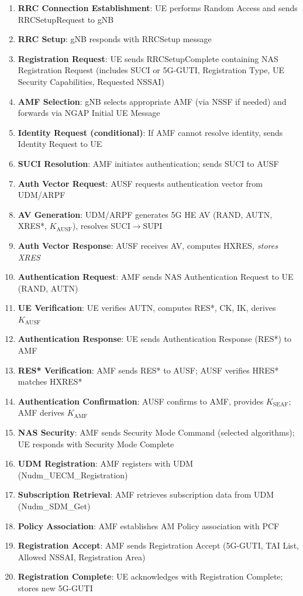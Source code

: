 \begin{enumerate}
\def\labelenumi{\arabic{enumi}.}
\tightlist
\item
  \textbf{RRC Connection Establishment}: UE performs Random Access and sends RRCSetupRequest to gNB
\item
  \textbf{RRC Setup}: gNB responds with RRCSetup message
\item
  \textbf{Registration Request}: UE sends RRCSetupComplete containing NAS Registration Request (includes SUCI or 5G-GUTI, Registration Type, UE Security Capabilities, Requested NSSAI)
\item
  \textbf{AMF Selection}: gNB selects appropriate AMF (via NSSF if needed) and forwards via NGAP Initial UE Message
\item
  \textbf{Identity Request (conditional)}: If AMF cannot resolve identity, sends Identity Request to UE
\item
  \textbf{SUCI Resolution}: AMF initiates authentication; sends SUCI to AUSF
\item
  \textbf{Auth Vector Request}: AUSF requests authentication vector from UDM/\allowbreak{}ARPF
\item
  \textbf{AV Generation}: UDM/\allowbreak{}ARPF generates 5G HE AV (RAND, AUTN, XRES*, \ensuremath{K_{\mathrm{AUSF}}}), resolves SUCI\ensuremath{\to}SUPI
\item
  \textbf{Auth Vector Response}: AUSF receives AV, computes HXRES\emph{, stores XRES}
\item
  \textbf{Authentication Request}: AMF sends NAS Authentication Request to UE (RAND, AUTN)
\item
  \textbf{UE Verification}: UE verifies AUTN, computes RES*, CK, IK, derives \ensuremath{K_{\mathrm{AUSF}}}
\item
  \textbf{Authentication Response}: UE sends Authentication Response (RES*) to AMF
\item
  \textbf{RES* Verification}: AMF sends RES* to AUSF; AUSF verifies HRES* matches HXRES*
\item
  \textbf{Authentication Confirmation}: AUSF confirms to AMF, provides \ensuremath{K_{\mathrm{SEAF}}}; AMF derives \ensuremath{K_{\mathrm{AMF}}}
\item
  \textbf{NAS Security}: AMF sends Security Mode Command (selected algorithms); UE responds with Security Mode Complete
\item
  \textbf{UDM Registration}: AMF registers with UDM (Nudm\_\allowbreak{}UECM\_\allowbreak{}Registration)
\item
  \textbf{Subscription Retrieval}: AMF retrieves subscription data from UDM (Nudm\_\allowbreak{}SDM\_\allowbreak{}Get)
\item
  \textbf{Policy Association}: AMF establishes AM Policy association with PCF
\item
  \textbf{Registration Accept}: AMF sends Registration Accept (5G-GUTI, TAI List, Allowed NSSAI, Registration Area)
\item
  \textbf{Registration Complete}: UE acknowledges with Registration Complete; stores new 5G-GUTI
\end{enumerate}

